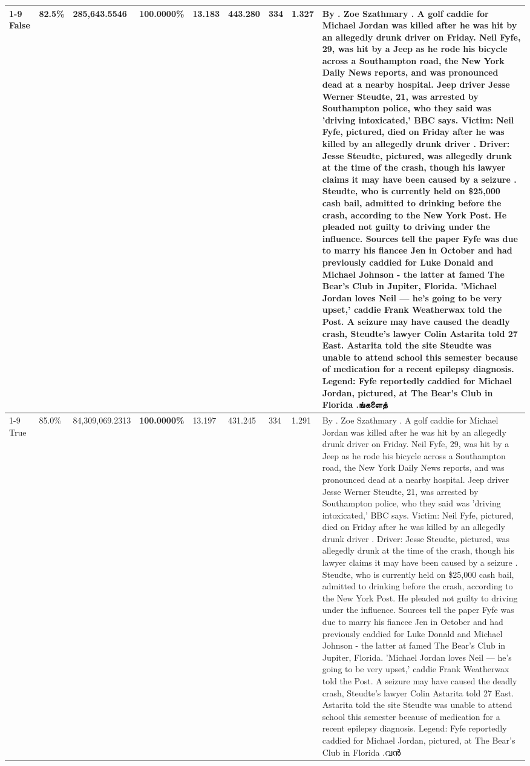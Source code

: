 \begin{table}[H]
\begin{tabular}{lllrlllll}
\cline{1-9}
False & 82.5\% & \color{red} 285,643.5546 & \bfseries \color{red} 100.0000\% & 13.183 & 443.280 & 334 & 1.327 & By . Zoe Szathmary . A golf caddie for Michael Jordan was killed after he was hit by an allegedly drunk driver on Friday. Neil Fyfe, 29, was hit by a Jeep as he rode his bicycle across a Southampton road, the New York Daily News reports, and was pronounced dead at a nearby hospital. Jeep driver Jesse Werner Steudte, 21, was arrested by Southampton police, who they said was 'driving intoxicated,' BBC says. Victim: Neil Fyfe, pictured, died on Friday after he was killed by an allegedly drunk driver . Driver: Jesse Steudte, pictured, was allegedly drunk at the time of the crash, though his lawyer claims it may have been caused by a seizure . Steudte, who is currently held on \$25,000 cash bail, admitted to drinking before the crash, according to the New York Post. He pleaded not guilty to driving under the influence. Sources tell the paper Fyfe was due to marry his fiancee Jen in October and had previously caddied for Luke Donald and Michael Johnson - the latter at famed The Bear's Club in Jupiter, Florida. 'Michael Jordan loves Neil — he’s going to be very upset,' caddie Frank Weatherwax told the Post. A seizure may have caused the deadly crash, Steudte's lawyer Colin Astarita told 27 East. Astarita told the site Steudte was unable to attend school this semester because of medication for a recent epilepsy diagnosis. Legend: Fyfe reportedly caddied for Michael Jordan, pictured, at The Bear's Club in Florida .ங்களைத் \\
\cline{1-9}
True & 85.0\% & 84,309,069.2313 & \bfseries \color{red} 100.0000\% & 13.197 & 431.245 & 334 & 1.291 & By . Zoe Szathmary . A golf caddie for Michael Jordan was killed after he was hit by an allegedly drunk driver on Friday. Neil Fyfe, 29, was hit by a Jeep as he rode his bicycle across a Southampton road, the New York Daily News reports, and was pronounced dead at a nearby hospital. Jeep driver Jesse Werner Steudte, 21, was arrested by Southampton police, who they said was 'driving intoxicated,' BBC says. Victim: Neil Fyfe, pictured, died on Friday after he was killed by an allegedly drunk driver . Driver: Jesse Steudte, pictured, was allegedly drunk at the time of the crash, though his lawyer claims it may have been caused by a seizure . Steudte, who is currently held on \$25,000 cash bail, admitted to drinking before the crash, according to the New York Post. He pleaded not guilty to driving under the influence. Sources tell the paper Fyfe was due to marry his fiancee Jen in October and had previously caddied for Luke Donald and Michael Johnson - the latter at famed The Bear's Club in Jupiter, Florida. 'Michael Jordan loves Neil — he’s going to be very upset,' caddie Frank Weatherwax told the Post. A seizure may have caused the deadly crash, Steudte's lawyer Colin Astarita told 27 East. Astarita told the site Steudte was unable to attend school this semester because of medication for a recent epilepsy diagnosis. Legend: Fyfe reportedly caddied for Michael Jordan, pictured, at The Bear's Club in Florida .വൻ \\

\end{tabular}
\end{table}
